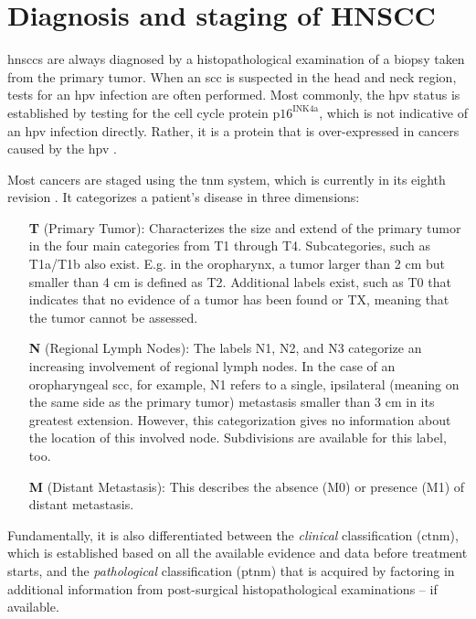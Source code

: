 \documentclass[\relativeRoot/main.tex]{subfiles}
\begin{document}
\section{Diagnosis and staging of HNSCC}
\label{sec:intro:diagnosis}

\Glspl{hnscc} are always diagnosed by a histopathological examination of a biopsy taken from the primary tumor. When an \gls{scc} is suspected in the head and neck region, tests for an \gls{hpv} infection are often performed. Most commonly, the \gls{hpv} status is established by testing for the cell cycle protein $\text{p16}^\text{INK4a}$, which is not indicative of an \gls{hpv} infection directly. Rather, it is a protein that is over-expressed in cancers caused by the \acrlong{hpv} \cite{johnson_head_2020}.

Most cancers are staged using the \gls{tnm} system, which is currently in its eighth revision \cite{brierley_tnm_2017}. It categorizes a patient's disease in three dimensions:

\begin{enumerate}
    \item[\textbf{T}] (Primary Tumor): Characterizes the size and extend of the primary tumor in the four main categories from T1 through T4. Subcategories, such as T1a/T1b also exist. E.g. in the oropharynx, a tumor larger than 2 cm but smaller than 4 cm is defined as T2. Additional labels exist, such as T0 that indicates that no evidence of a tumor has been found or TX, meaning that the tumor cannot be assessed.
    \item[\textbf{N}] (Regional Lymph Nodes): The labels N1, N2, and N3 categorize an increasing involvement of regional lymph nodes. In the case of an oropharyngeal \gls{scc}, for example, N1 refers to a single, ipsilateral (meaning on the same side as the primary tumor) metastasis smaller than 3 cm in its greatest extension. However, this categorization gives no information about the location of this involved node. Subdivisions are available for this label, too.
    \item[\textbf{M}] (Distant Metastasis): This describes the absence (M0) or presence (M1) of distant metastasis.
\end{enumerate}

Fundamentally, it is also differentiated between the \emph{clinical} classification (c\gls{tnm}), which is established based on all the available evidence and data before treatment starts, and the \emph{pathological} classification (p\gls{tnm}) that is acquired by factoring in additional information from post-surgical histopathological examinations -- if available.
\end{document}

